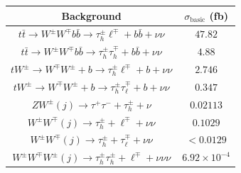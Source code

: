 \documentclass[prd,amsfonts,onecolumn,superscriptaddress,aps,nofootinbib,11pt]{revtex4-1}
\begin{document}
\begin{table}[h!]

\begin{tabular}{c c}
\hline
 Background & $\sigma_{\text{basic}}$ (fb) \\ \hline\hline 
 $t\bar{t}\to W^\pm W^\mp b\bar{b}\to \tau_{h}^\pm \ell^\mp + b\bar{b}+\nu\nu$ & $47.82$\\ %
 
 $t\bar{t}\to W^\pm W^\mp b\bar{b}\to \tau_{h}^\pm \tau_{h}^\mp + b\bar{b}+\nu\nu$ & $4.88$ \\ 
 \hline%

 $tW^\pm \to W^\mp W^\pm+b\to \tau_{h}^\pm \ell^\mp + b+ \nu\nu$ & $2.746$       \\ %
 $tW^\pm \to W^\mp W^\pm+b\to \tau_h^\pm \tau_{\ell}^\mp + b+ \nu\nu$ & $0.347$ \\ \hline%
 
 $ZW^\pm(j)  \to \tau^+\tau^- + \tau_{h}^\pm + \nu$ & $0.02113$ \\ 

 $W^\pm W^\mp(j) \to \tau_h^\pm + \ell^\mp + \nu\nu$ & $0.1029$ \\ 
 
 $W^\pm W^\mp(j) \to \tau_h^\pm + \tau_{\ell}^\mp + \nu\nu$ & $<0.0129$ \\ 
 \hline
 
 $W^\pm W^\mp W^\pm(j)  \to \tau_h^\pm\tau_h^\pm + \ell^\mp + \nu\nu\nu$ & $6.92\times 10^{-4}$  \\ %
 

\end{tabular}
\end{table}
\end{document}
